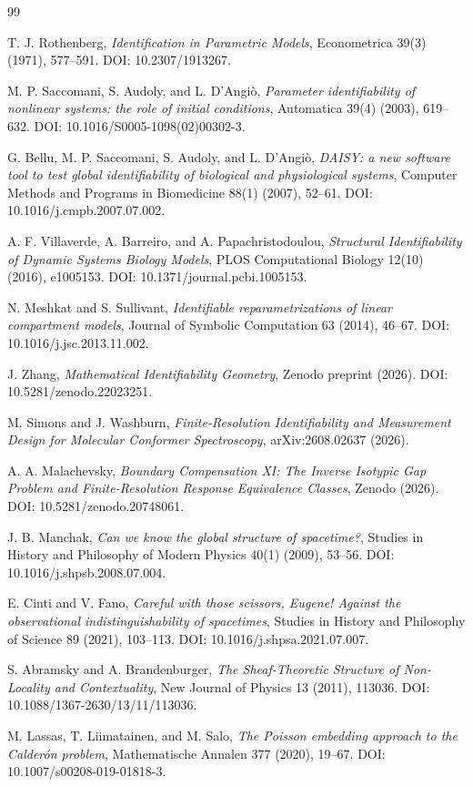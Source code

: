 \documentclass[11pt]{article}
\begin{document}
\begin{thebibliography}{99}

T. J. Rothenberg,
\emph{Identification in Parametric Models},
Econometrica 39(3) (1971), 577--591.
DOI: 10.2307/1913267.

M. P. Saccomani, S. Audoly, and L. D'Angi\`o,
\emph{Parameter identifiability of nonlinear systems: the role of initial conditions},
Automatica 39(4) (2003), 619--632.
DOI: 10.1016/S0005-1098(02)00302-3.

G. Bellu, M. P. Saccomani, S. Audoly, and L. D'Angi\`o,
\emph{DAISY: a new software tool to test global identifiability of biological
and physiological systems},
Computer Methods and Programs in Biomedicine 88(1) (2007), 52--61.
DOI: 10.1016/j.cmpb.2007.07.002.

A. F. Villaverde, A. Barreiro, and A. Papachristodoulou,
\emph{Structural Identifiability of Dynamic Systems Biology Models},
PLOS Computational Biology 12(10) (2016), e1005153.
DOI: 10.1371/journal.pcbi.1005153.

N. Meshkat and S. Sullivant,
\emph{Identifiable reparametrizations of linear compartment models},
Journal of Symbolic Computation 63 (2014), 46--67.
DOI: 10.1016/j.jsc.2013.11.002.

J. Zhang,
\emph{Mathematical Identifiability Geometry},
Zenodo preprint (2026).
DOI: 10.5281/zenodo.22023251.


M. Simons and J. Washburn,
\emph{Finite-Resolution Identifiability and Measurement Design for Molecular
Conformer Spectroscopy},
arXiv:2608.02637 (2026).

A. A. Malachevsky,
\emph{Boundary Compensation XI: The Inverse Isotypic Gap Problem and
Finite-Resolution Response Equivalence Classes},
Zenodo (2026).
DOI: 10.5281/zenodo.20748061.

J. B. Manchak,
\emph{Can we know the global structure of spacetime?},
Studies in History and Philosophy of Modern Physics 40(1) (2009), 53--56.
DOI: 10.1016/j.shpsb.2008.07.004.

E. Cinti and V. Fano,
\emph{Careful with those scissors, Eugene! Against the observational
indistinguishability of spacetimes},
Studies in History and Philosophy of Science 89 (2021), 103--113.
DOI: 10.1016/j.shpsa.2021.07.007.

S. Abramsky and A. Brandenburger,
\emph{The Sheaf-Theoretic Structure of Non-Locality and Contextuality},
New Journal of Physics 13 (2011), 113036.
DOI: 10.1088/1367-2630/13/11/113036.

M. Lassas, T. Liimatainen, and M. Salo,
\emph{The Poisson embedding approach to the Calder\'on problem},
Mathematische Annalen 377 (2020), 19--67.
DOI: 10.1007/s00208-019-01818-3.

\end{thebibliography}
\end{document}
